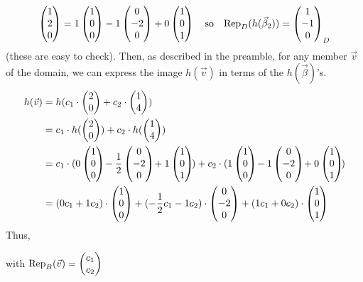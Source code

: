 \begin{example}
\begin{equation*}
  \colvec{1 \\ 2 \\ 0}=
        1\colvec{1 \\ 0 \\ 0}
        -1\colvec{0 \\ -2 \\ 0}
        +0\colvec{1 \\ 0 \\ 1}
  \quad\text{so}\quad
  \rep{ h(\vec{\beta}_2) }{D}=\colvec{1 \\ -1 \\ 0}_D
\end{equation*}
(these are easy to check).
Then, as described in the preamble, for any member $\vec{v}$ of the domain,
we can express the image $h(\vec{v})$ in terms of the $h(\vec{\beta})$'s.
\begin{align*}
  h(\vec{v})
  &=h(c_1\cdot \colvec{2 \\ 0}+c_2\cdot \colvec{1 \\ 4})   \\
  &=c_1\cdot h(\colvec{2 \\ 0})+c_2\cdot h(\colvec{1 \\ 4}) \\
  &=c_1\cdot (
        0\colvec{1 \\ 0 \\ 0}
        \!-\frac{1}{2}\colvec{0 \\ -2 \\ 0}
        \!+1\colvec{1 \\ 0 \\ 1}\!  )
  +c_2\cdot (
        1\colvec{1 \\ 0 \\ 0}
        \!-1\colvec{0 \\ -2 \\ 0}
        \!+0\colvec{1 \\ 0 \\ 1}\!  )      \\
  &=(0c_1+1c_2)\cdot \colvec{1 \\ 0 \\ 0}
   +(-\frac{1}{2}c_1-1c_2)\cdot \colvec{0 \\ -2 \\ 0}
   +(1c_1+0c_2)\cdot \colvec{1 \\ 0 \\ 1}
\end{align*}
Thus,
\begin{center}
  with $\rep{\vec{v}}{B}=\colvec{c_1 \\ c_2}$

\end{center}
\end{example}

